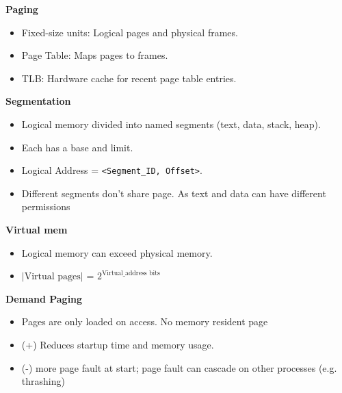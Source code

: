 \documentclass[8pt,twocolumn]{article}
\begin{document}
\vspace{-0.6em}
\textbf{Paging}
\vspace{-0.6em}
\begin{itemize}
    \setlength{\itemsep}{0pt} %
    \setlength{\parskip}{0pt}
  \item Fixed-size units: Logical pages and physical frames.
  \item Page Table: Maps pages to frames.
  \item TLB: Hardware cache for recent page table entries.
\end{itemize}
\vspace{-0.6em}
\textbf{Segmentation}
\vspace{-0.6em}
\begin{itemize}
    \setlength{\itemsep}{0pt} %
    \setlength{\parskip}{0pt}
  \item Logical memory divided into named segments (text, data, stack, heap).
  \item Each has a base and limit.
  \item Logical Address = \texttt{<Segment\_ID, Offset>}.
  \item Different segments don't share page. As text and data can have different permissions
\end{itemize}
\vspace{-0.6em}
\textbf{Virtual mem}
\vspace{-0.6em}
\begin{itemize}
    \setlength{\itemsep}{0pt} %
    \setlength{\parskip}{0pt}
  \item Logical memory can exceed physical memory.
  \item $|\text{Virtual pages}|$ = $2^{\text{Virtual\_address bits}}$
\end{itemize}
\vspace{-0.6em}
\textbf{Demand Paging}
\vspace{-0.6em}
\begin{itemize}
    \setlength{\itemsep}{0pt} %
    \setlength{\parskip}{0pt}
  \item Pages are only loaded on access. No memory resident page 
  \item (+) Reduces startup time and memory usage.
  \item (-) more page fault at start; page fault can cascade on other processes (e.g. thrashing)
\end{itemize}
\vspace{-0.6em}
\end{document}
